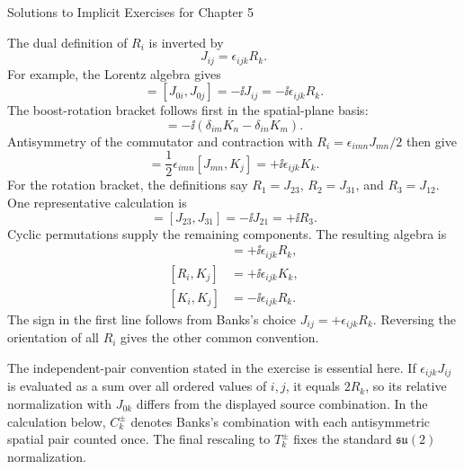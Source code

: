 \begin{bankssolutions}{Solutions to Implicit Exercises for Chapter 5}

The dual definition of $R_i$ is inverted by
\begin{equation*}
  J_{ij}=\epsilon_{ijk}R_k.
\end{equation*}
For example, the Lorentz algebra gives
\begin{equation*}
  [K_i,K_j]=[J_{0i},J_{0j}]
  =-\ii J_{ij}=-\ii\epsilon_{ijk}R_k.
\end{equation*}
The boost-rotation bracket follows first in the spatial-plane basis:
\begin{equation*}
  [K_i,J_{mn}]
  =-\ii\left(\delta_{im}K_n-\delta_{in}K_m\right).
\end{equation*}
Antisymmetry of the commutator and contraction with
$R_i=\epsilon_{imn}J_{mn}/2$ then give
\begin{equation*}
  [R_i,K_j]
  =\frac12\epsilon_{imn}[J_{mn},K_j]
  =+\ii\epsilon_{ijk}K_k.
\end{equation*}
For the rotation bracket, the definitions say
$R_1=J_{23}$, $R_2=J_{31}$, and $R_3=J_{12}$.  One representative
calculation is
\begin{equation*}
  [R_1,R_2]=[J_{23},J_{31}]
  =-\ii J_{21}=+\ii R_3.
\end{equation*}
Cyclic permutations supply the remaining components.  The resulting algebra
is
\begin{align*}
  [R_i,R_j]&=+\ii\epsilon_{ijk}R_k,\\
  [R_i,K_j]&=+\ii\epsilon_{ijk}K_k,\\
  [K_i,K_j]&=-\ii\epsilon_{ijk}R_k.
\end{align*}
The sign in the first line follows from Banks's choice
$J_{ij}=+\epsilon_{ijk}R_k$.  Reversing the orientation of all $R_i$ gives
the other common convention.

The independent-pair convention stated in the exercise is essential here.
If $\epsilon_{ijk}J_{ij}$ is evaluated as a sum over all ordered values of
$i,j$, it equals $2R_k$, so its relative normalization with $J_{0k}$ differs
from the displayed source combination.  In the calculation below,
$C_k^\pm$ denotes Banks's combination with each antisymmetric spatial pair
counted once.  The final rescaling to $T_k^\pm$ fixes the standard
$\mathfrak{su}(2)$ normalization.


\end{bankssolutions}
